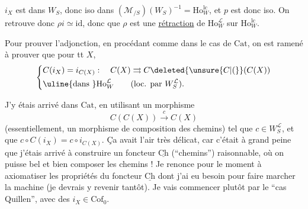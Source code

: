 $i_X$ est dans $W_S$, donc iso dans $(\mathcal M_{/S})(W_S)^{-1}=\mathrm{Ho}^{\mathrm{lc}}_W$, et $p$ est donc iso. On retrouve donc $\rho i\simeq\mathrm{id}$, donc que $\rho$ est une \uline{rétraction} de $\mathrm{Ho}^{\mathcal L}_W$ sur $\mathrm{Ho}^{\mathrm{lc}}_W$.

Pour prouver l'adjonction, en procédant comme dans le cas de $\mathrm{Cat}$, on est ramené à prouver que pour tt $X$,
\[
\left\{\begin{aligned}
&C(i_X)=i_{C(X)}:\quad C(X)\rightrightarrows C\deleted{\unsure{C|(}}(C(X))\\
&\text{\uline{dans }}\mathrm{Ho}^{\mathcal L}_W\qquad(\text{loc. par }W_S^{\mathcal L})\text{.}
\end{aligned}\right.
\]

J'y étais arrivé dans $\mathrm{Cat}$, en utilisant un morphisme
\[
C(C(X))\xrightarrow{c}C(X)
\]
(essentiellement, un morphisme de composition des chemins) tel que $c\in W_S^{\mathcal L}$, et que $c\circ C(i_X)=c\circ i_{C(X)}$. Ça avait l'air très délicat, car c'était à grand peine que j'étais arrivé à construire un foncteur $\underline{\mathrm{Ch}}$ (``chemins'') \unsure{,} raisonnable, où on puisse bel et bien composer les chemins ! Je renonce pour le moment à axiomatiser les propriétés du foncteur $\underline{\mathrm{Ch}}$ dont j'ai eu besoin pour faire marcher la machine (je devrais y revenir tantôt).
Je vais commencer plutôt par le ``cas Quillen'', avec des $i_X\in\mathrm{Cof}_0$.

